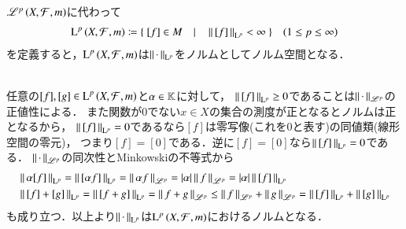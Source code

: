 $\mathscr{L}^{p} \left(X,\mathcal{F},m\right)$に代わって
\begin{align}
	\operatorname{L}^{p} \left(X,\mathcal{F},m\right) \coloneqq \{\ [f] \in M \quad |\quad \left\|\, [f]\, \right\|_{\mathrm{L}^p} < \infty\ \} \quad (1 \leq p \leq \infty)
\end{align}
を定義すると，$\operatorname{L}^{p} \left(X,\mathcal{F},m\right)$は$\left\|\, \cdot\, \right\|_{\mathrm{L}^p}$をノルムとしてノルム空間となる．
\begin{bcs}\mbox{}\\
	任意の$[f],[g] \in \operatorname{L}^{p} \left(X,\mathcal{F},m\right)$と$\alpha \in \mathbb{K}$に対して，
	$\left\|\, [f]\, \right\|_{\mathrm{L}^p} \geq 0$であることは$\left\|\, \cdot\, \right\|_{\mathscr{L}^p}$の正値性による．
	また関数が0でない$x \in X$の集合の測度が正となるとノルムは正となるから，
	$\left\|\, [f]\, \right\|_{\mathrm{L}^p} = 0$であるなら$[f]$は零写像(これを0と表す)の同値類(線形空間の零元)，
	つまり$[f] = [0]$である．逆に$[f] = [0]$なら$\left\|\, [f]\, \right\|_{\mathrm{L}^p} = 0$である．
	$\left\|\, \cdot\, \right\|_{\mathscr{L}^p}$の同次性とMinkowskiの不等式から
	\begin{align}
		&\left\|\, \alpha[f]\, \right\|_{\mathrm{L}^p} = \left\|\, [\alpha f]\, \right\|_{\mathrm{L}^p} = \left\|\, \alpha f\, \right\|_{\mathscr{L}^p} = |\alpha|\left\|\, f\, \right\|_{\mathscr{L}^p} = |\alpha|\left\|\, [f]\, \right\|_{\mathrm{L}^p} \\
		&\left\|\, [f] + [g]\, \right\|_{\mathrm{L}^p} = \left\|\, [f + g]\, \right\|_{\mathrm{L}^p} = \left\|\, f + g\, \right\|_{\mathscr{L}^p} \leq \left\|\, f\, \right\|_{\mathscr{L}^p} + \left\|\, g\, \right\|_{\mathscr{L}^p} = \left\|\, [f]\, \right\|_{\mathrm{L}^p} + \left\|\, [g]\, \right\|_{\mathrm{L}^p}
	\end{align}
	も成り立つ．以上より$\left\|\, \cdot\, \right\|_{\mathrm{L}^p}$は$\operatorname{L}^{p} \left(X,\mathcal{F},m\right)$におけるノルムとなる．
	\QED
\end{bcs}

